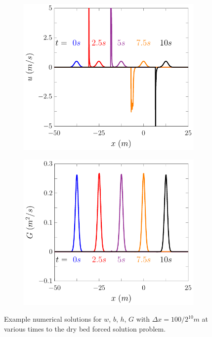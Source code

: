 \documentclass[times]{elsarticle}
\begin{document}
\begin{figure}
\begin{subfigure}{0.5\textwidth}
		\vspace{0.2cm}
	\end{subfigure}
	\begin{subfigure}{0.5\textwidth}
\includegraphics[width=\textwidth]{./Figures/Forced/Dry/u.pdf}
		\vspace{0.2cm}
	\end{subfigure}%
	\begin{subfigure}{0.5\textwidth}
\includegraphics[width=\textwidth]{./Figures/Forced/Dry/G.pdf}
		\vspace{0.2cm}
	\end{subfigure}
	\caption{Example numerical solutions for $w$, $b$, $h$, $G$ with $\Delta x = 100 / 2^{10}m$ at various times to the dry bed forced solution problem.}
	\label{fig:ExampleForcedSolutionDry}
\end{figure}
\end{document}
